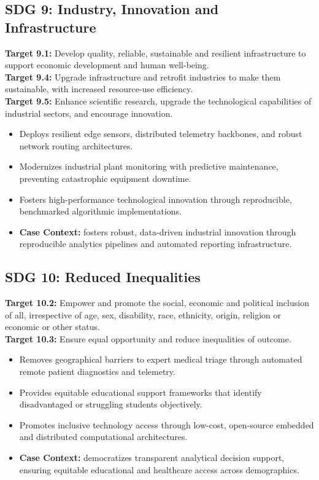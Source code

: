 \subsection{SDG 9: Industry, Innovation and Infrastructure}
\noindent\textbf{Target 9.1:} Develop quality, reliable, sustainable and resilient infrastructure to support economic development and human well-being. \\
\noindent\textbf{Target 9.4:} Upgrade infrastructure and retrofit industries to make them sustainable, with increased resource-use efficiency. \\
\noindent\textbf{Target 9.5:} Enhance scientific research, upgrade the technological capabilities of industrial sectors, and encourage innovation.
\begin{itemize}
  \item Deploys resilient edge sensors, distributed telemetry backbones, and robust network routing architectures.
  \item Modernizes industrial plant monitoring with predictive maintenance, preventing catastrophic equipment downtime.
  \item Fosters high-performance technological innovation through reproducible, benchmarked algorithmic implementations.
  \item \textbf{Case Context:} fosters robust, data-driven industrial innovation through reproducible analytics pipelines and automated reporting infrastructure.
\end{itemize}

\subsection{SDG 10: Reduced Inequalities}
\noindent\textbf{Target 10.2:} Empower and promote the social, economic and political inclusion of all, irrespective of age, sex, disability, race, ethnicity, origin, religion or economic or other status. \\
\noindent\textbf{Target 10.3:} Ensure equal opportunity and reduce inequalities of outcome.
\begin{itemize}
  \item Removes geographical barriers to expert medical triage through automated remote patient diagnostics and telemetry.
  \item Provides equitable educational support frameworks that identify disadvantaged or struggling students objectively.
  \item Promotes inclusive technology access through low-cost, open-source embedded and distributed computational architectures.
  \item \textbf{Case Context:} democratizes transparent analytical decision support, ensuring equitable educational and healthcare access across demographics.
\end{itemize}
